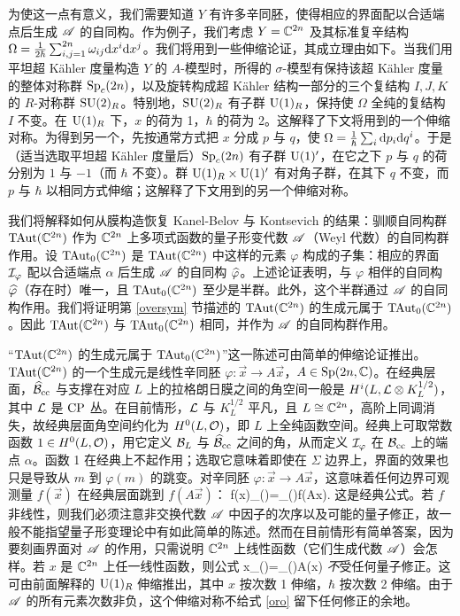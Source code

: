 为使这一点有意义，我们需要知道 $Y$ 有许多辛同胚，使得相应的界面配以合适端点后生成 ${\mathscr A}$ 的自同构。作为例子，我们考虑 $Y={\mathbb C}^{2n}$ 及其标准复辛结构
$\Omega=\frac{1}{2\hbar}\sum_{i,j=1}^{2n}\omega_{ij}{\mathrm d} x^i{\mathrm d} x^j$。我们将用到一些伸缩论证，其成立理由如下。当我们用平坦超 Kähler 度量构造 $Y$ 的 $A$-模型时，所得的 $\sigma$-模型有保持该超 Kähler 度量的整体对称群 ${\mathrm{Sp}}_c(2n)$，以及旋转构成超 Kähler 结构一部分的三个复结构 $I,J,K$ 的 $R$-对称群 ${\mathrm{SU}}(2)_R$。特别地，${\mathrm{SU}}(2)_R$ 有子群 ${\mathrm U}(1)_R$，保持使 $\Omega$ 全纯的复结构 $I$ 不变。在 ${\mathrm U}(1)_R$ 下，$x$ 的荷为 1，$\hbar$ 的荷为 2。这解释了下文将用到的一个伸缩对称。为得到另一个，先按通常方式把 $x$ 分成 $p$ 与 $q$，使 $\Omega=\frac1\hbar\sum_i{\mathrm d} p_i{\mathrm d} q^i$。于是（适当选取平坦超 Kähler 度量后）${\mathrm{Sp}}_c(2n)$ 有子群 ${\mathrm U}(1)'$，在它之下 $p$ 与 $q$ 的荷分别为 $1$ 与 $-1$（而 $\hbar$ 不变）。群 ${\mathrm U}(1)_R\times{\mathrm U}(1)'$ 有对角子群，在其下 $q$ 不变，而 $p$ 与 $\hbar$ 以相同方式伸缩；这解释了下文用到的另一个伸缩对称。

我们将解释如何从膜构造恢复 Kanel-Belov 与 Kontsevich \cite{BKK} 的结果：驯顺自同构群 ${\mathrm{TAut}}({\mathbb C}^{2n})$ 作为 ${\mathbb C}^{2n}$ 上多项式函数的量子形变代数 ${\mathscr A}$（Weyl 代数）的自同构群作用。设 ${\mathrm{TAut}}_0({\mathbb C}^{2n})$ 是 ${\mathrm{TAut}}({\mathbb C}^{2n})$ 中这样的元素 $\varphi$ 构成的子集：相应的界面 ${\mathcal I}_\varphi$ 配以合适端点 $\alpha$ 后生成 ${\mathscr A}$ 的自同构 $\widehat\varphi$。上述论证表明，与 $\varphi$ 相伴的自同构 $\widehat\varphi$（存在时）唯一，且 ${\mathrm{TAut}}_0({\mathbb C}^{2n})$ 至少是半群。此外，这个半群通过 ${\mathscr A}$ 的自同构作用。我们将证明第 \ref{oversym} 节描述的 ${\mathrm{TAut}}({\mathbb C}^{2n})$ 的生成元属于 ${\mathrm{TAut}}_0({\mathbb C}^{2n})$。因此 ${\mathrm{TAut}}({\mathbb C}^{2n})$ 与 ${\mathrm{TAut}}_0({\mathbb C}^{2n})$ 相同，并作为 ${\mathscr A}$ 的自同构群作用。

“${\mathrm{TAut}}({\mathbb C}^{2n})$ 的生成元属于 ${\mathrm{TAut}}_0({\mathbb C}^{2n})$”这一陈述可由简单的伸缩论证推出。${\mathrm{TAut}}({\mathbb C}^{2n})$ 的一个生成元是线性辛同胚 $\varphi:\vec x\to A\vec x$，$A\in{\mathrm{Sp}}(2n,{\mathbb C})$。在经典层面，$\widehat{{\mathcal B}}_{\mathrm{cc}}$ 与支撑在对应 $L$ 上的拉格朗日膜之间的角空间一般是 $H^i(L,{\mathcal L}\otimes K_L^{1/2})$，其中 ${\mathcal L}$ 是 ${\mathrm{CP}}$ 丛。在目前情形，${\mathcal L}$ 与 $K_L^{1/2}$ 平凡，且 $L\cong{\mathbb C}^{2n}$，高阶上同调消失，故经典层面角空间约化为 $H^0(L,{\mathcal O})$，即 $L$ 上全纯函数空间。经典上可取常数函数 $1\in H^0(L,{\mathcal O})$，用它定义 ${\mathcal B}_L$ 与 $\widehat{{\mathcal B}}_{\mathrm{cc}}$ 之间的角，从而定义 ${\mathcal I}_\varphi$ 在 ${\mathcal B}_{\mathrm{cc}}$ 上的端点 $\alpha$。函数 1 在经典上不起作用；选取它意味着即使在 $\Sigma$ 边界上，界面的效果也只是导致从 $m$ 到 $\varphi(m)$ 的跳变。对辛同胚 $\varphi:\vec x\to A\vec x$，这意味着任何边界可观测量 $f(\vec x)$ 在经典层面跳到 $f(A\vec x)$：
\be\label{woro}f(\vec x)\I_\varphi(\alpha)=\I_\varphi(\alpha)f(A\vec x).\ee
这是经典公式。若 $f$ 非线性，则我们必须注意非交换代数 ${\mathscr A}$ 中因子的次序以及可能的量子修正，故一般不能指望量子形变理论中有如此简单的陈述。然而在目前情形有简单答案，因为要刻画界面对 ${\mathscr A}$ 的作用，只需说明 ${\mathbb C}^{2n}$ 上线性函数（它们生成代数 ${\mathscr A}$）会怎样。若 $x$ 是 ${\mathbb C}^{2n}$ 上任一线性函数，则公式
\be\label{oro}x\I_\varphi(\alpha)=\I_\varphi(\alpha)A(x)\ee
\emph{不}受任何量子修正。这可由前面解释的 ${\mathrm U}(1)_R$ 伸缩推出，其中 $x$ 按次数 1 伸缩，$\hbar$ 按次数 2 伸缩。由于 ${\mathscr A}$ 的所有元素次数非负，这个伸缩对称不给式 \eqref{oro} 留下任何修正的余地。

